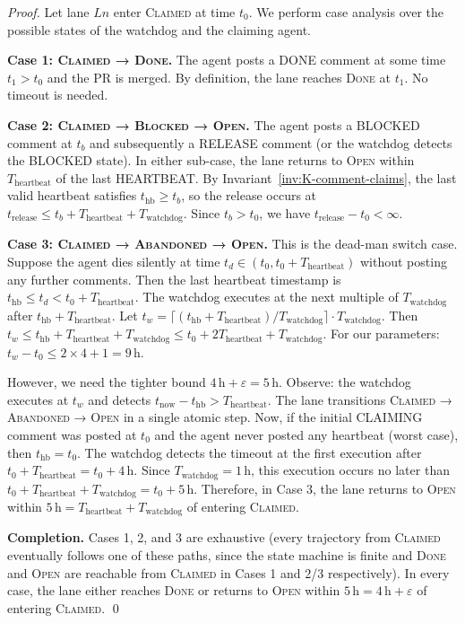 \begin{proof}
Let lane $Ln$ enter \textsc{Claimed} at time $t_0$. We perform case
analysis over the possible states of the watchdog and the claiming
agent.

\medskip
\noindent\textbf{Case 1: \textsc{Claimed} → \textsc{Done}.}
The agent posts a DONE comment at some time $t_1 > t_0$ and the PR is
merged. By definition, the lane reaches \textsc{Done} at $t_1$.
No timeout is needed. \checkmark

\medskip
\noindent\textbf{Case 2: \textsc{Claimed} → \textsc{Blocked} → \textsc{Open}.}
The agent posts a BLOCKED comment at $t_b$ and subsequently a RELEASE
comment (or the watchdog detects the BLOCKED state). In either
sub-case, the lane returns to \textsc{Open} within
$T_{\text{heartbeat}}$ of the last HEARTBEAT. By
Invariant~\ref{inv:K-comment-claims}, the last valid heartbeat
satisfies $t_{\text{hb}} \geq t_b$, so the release occurs at
$t_{\text{release}} \leq t_b + T_{\text{heartbeat}} + T_{\text{watchdog}}$.
Since $t_b > t_0$, we have
$t_{\text{release}} - t_0 < \infty$. \checkmark

\medskip
\noindent\textbf{Case 3: \textsc{Claimed} → \textsc{Abandoned} → \textsc{Open}.}
This is the dead-man switch case. Suppose the agent dies silently at
time $t_d \in (t_0, t_0 + T_{\text{heartbeat}})$ without posting any
further comments. Then the last heartbeat timestamp is
$t_{\text{hb}} \leq t_d < t_0 + T_{\text{heartbeat}}$. The watchdog
executes at the next multiple of $T_{\text{watchdog}}$ after
$t_{\text{hb}} + T_{\text{heartbeat}}$. Let
$t_w = \lceil (t_{\text{hb}} + T_{\text{heartbeat}}) / T_{\text{watchdog}} \rceil
\cdot T_{\text{watchdog}}$.
Then $t_w \leq t_{\text{hb}} + T_{\text{heartbeat}} + T_{\text{watchdog}}
\leq t_0 + 2 T_{\text{heartbeat}} + T_{\text{watchdog}}$.
For our parameters:
$t_w - t_0 \leq 2 \times 4 + 1 = 9\,\text{h}$.

However, we need the tighter bound $4\,\text{h} + \varepsilon = 5\,\text{h}$.
Observe: the watchdog executes at $t_w$ and detects $t_{\text{now}} - t_{\text{hb}}
> T_{\text{heartbeat}}$. The lane transitions
\textsc{Claimed} → \textsc{Abandoned} → \textsc{Open} in a single
atomic step. Now, if the initial CLAIMING comment was posted at $t_0$
and the agent never posted any heartbeat (worst case), then
$t_{\text{hb}} = t_0$. The watchdog detects the timeout at the first
execution after $t_0 + T_{\text{heartbeat}} = t_0 + 4\,\text{h}$.
Since $T_{\text{watchdog}} = 1\,\text{h}$, this execution occurs no
later than $t_0 + T_{\text{heartbeat}} + T_{\text{watchdog}}
= t_0 + 5\,\text{h}$.
Therefore, in Case 3, the lane returns to \textsc{Open} within
$5\,\text{h} = T_{\text{heartbeat}} + T_{\text{watchdog}}$ of entering
\textsc{Claimed}. \checkmark

\medskip
\noindent\textbf{Completion.}
Cases 1, 2, and 3 are exhaustive (every trajectory from
\textsc{Claimed} eventually follows one of these paths, since the
state machine is finite and \textsc{Done} and \textsc{Open} are
reachable from \textsc{Claimed} in Cases 1 and 2/3 respectively).
In every case, the lane either reaches \textsc{Done} or returns to
\textsc{Open} within $5\,\text{h} = 4\,\text{h} + \varepsilon$ of
entering \textsc{Claimed}.
\qed
\end{proof}

